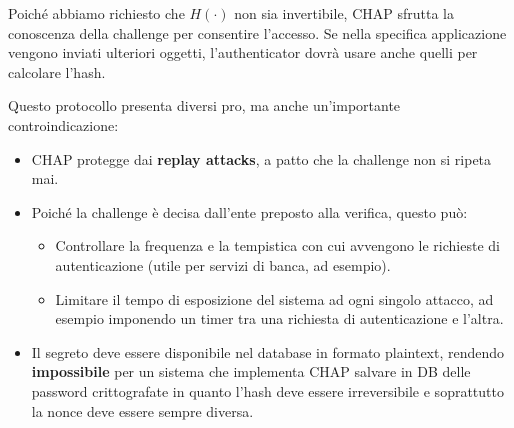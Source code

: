 \begin{remark}
Poiché abbiamo richiesto che $H(\cdot)$ non sia invertibile, CHAP sfrutta la conoscenza della challenge per consentire l'accesso. Se nella specifica applicazione vengono inviati ulteriori oggetti, l'authenticator dovrà usare anche quelli per calcolare l'hash.
\end{remark}
Questo protocollo presenta diversi pro, ma anche un'importante controindicazione:
\begin{itemize}
    \item [\textcolor{green}{\checkmark}]CHAP protegge dai \textbf{replay attacks}, a patto che la challenge non si ripeta mai.
    \item [\textcolor{green}{\checkmark}]Poiché la challenge è decisa dall'ente preposto alla verifica, questo può:
    \begin{itemize}
        \item Controllare la frequenza e la tempistica con cui avvengono le richieste di autenticazione (utile per servizi di banca, ad esempio).
        \item Limitare il tempo di esposizione del sistema ad ogni singolo attacco, ad esempio imponendo un timer tra una richiesta di autenticazione e l'altra.
    \end{itemize}
    \item [\textcolor{red}{\ding{55}}]Il segreto deve essere disponibile nel database in formato plaintext, rendendo \textbf{impossibile} per un sistema che implementa CHAP salvare in DB delle password crittografate in quanto l'hash deve essere irreversibile e soprattutto la nonce deve essere sempre diversa.
\end{itemize}
